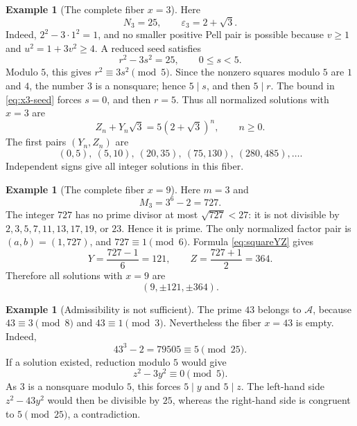 \documentclass[11pt,a4paper]{amsart}
\theoremstyle{definition}
\newtheorem{example}[theorem]{Example}
\newcommand{\Acal}{\mathcal A}
\newcommand{\eps}{\varepsilon}
\numberwithin{equation}{section}
\begin{document}
\begin{example}[The complete fiber \(x=3\)]
Here
\begin{equation}
 N_3=25,
 \qquad
 \eps_3=2+\sqrt3.
\end{equation}
Indeed, \(2^2-3\cdot1^2=1\), and no smaller positive Pell pair is possible because
\(v\geq1\) and \(u^2=1+3v^2\geq4\).
A reduced seed satisfies
\begin{equation}
 r^2-3s^2=25,
 \qquad
 0\leq s<5.
 \label{eq:x3-seed}
\end{equation}
Modulo \(5\), this gives \(r^2\equiv3s^2\pmod5\).  Since the nonzero squares modulo
\(5\) are \(1\) and \(4\), the number \(3\) is a nonsquare; hence \(5\mid s\), and
then \(5\mid r\).  The bound in \eqref{eq:x3-seed} forces \(s=0\), and then
\(r=5\).  Thus all normalized solutions with \(x=3\) are
\begin{equation}
 Z_n+Y_n\sqrt3=5(2+\sqrt3)^n,
 \qquad n\geq0.
 \label{eq:x3-family}
\end{equation}
The first pairs \((Y_n,Z_n)\) are
\begin{equation}
 (0,5),\ (5,10),\ (20,35),\ (75,130),\ (280,485),\ldots.
\end{equation}
Independent signs give all integer solutions in this fiber.
\end{example}

\begin{example}[The complete fiber \(x=9\)]
Here \(m=3\) and
\begin{equation}
 M_3=3^6-2=727.
\end{equation}
The integer \(727\) has no prime divisor at most \(\sqrt{727}<27\): it is not
divisible by \(2,3,5,7,11,13,17,19\), or \(23\).  Hence it is prime.  The only
normalized factor pair is \((a,b)=(1,727)\), and
\(727\equiv1\pmod6\).  Formula \eqref{eq:squareYZ} gives
\begin{equation}
 Y=\frac{727-1}{6}=121,
 \qquad
 Z=\frac{727+1}{2}=364.
\end{equation}
Therefore all solutions with \(x=9\) are
\begin{equation}
 (9,\pm121,\pm364).
\end{equation}
\end{example}

\begin{example}[Admissibility is not sufficient]
The prime \(43\) belongs to \(\Acal\), because
\(43\equiv3\pmod8\) and \(43\equiv1\pmod3\).  Nevertheless the fiber \(x=43\) is
empty.  Indeed,
\begin{equation}
 43^3-2=79505\equiv5\pmod{25}.
\end{equation}
If a solution existed, reduction modulo \(5\) would give
\begin{equation}
 z^2-3y^2\equiv0\pmod5.
\end{equation}
As \(3\) is a nonsquare modulo \(5\), this forces \(5\mid y\) and \(5\mid z\).
The left-hand side \(z^2-43y^2\) would then be divisible by \(25\), whereas the
right-hand side is congruent to \(5\pmod{25}\), a contradiction.
\end{example}
\end{document}
